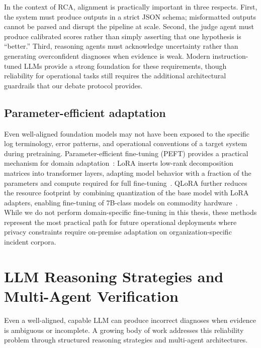 In the context of RCA, alignment is practically important in three respects. First, the system
must produce outputs in a strict JSON schema; misformatted outputs cannot be parsed and disrupt
the pipeline at scale. Second, the judge agent must produce calibrated scores rather than simply
asserting that one hypothesis is ``better.'' Third, reasoning agents must acknowledge uncertainty
rather than generating overconfident diagnoses when evidence is weak. Modern instruction-tuned
LLMs provide a strong foundation for these requirements, though reliability for operational tasks
still requires the additional architectural guardrails that our debate protocol provides.

\subsection{Parameter-efficient adaptation}

Even well-aligned foundation models may not have been exposed to the specific log terminology,
error patterns, and operational conventions of a target system during pretraining. Parameter-efficient
fine-tuning (PEFT) provides a practical mechanism for domain
adaptation~\cite{raffel2023exploringlimitstransferlearning}: LoRA inserts low-rank decomposition
matrices into transformer layers, adapting model behavior with a fraction of the parameters and
compute required for full fine-tuning~\cite{hu2021loralowrankadaptationlarge}. QLoRA further
reduces the resource footprint by combining quantization of the base model with LoRA adapters,
enabling fine-tuning of 7B-class models on commodity
hardware~\cite{dettmers2023qloraefficientfinetuningquantized}. While we do not perform
domain-specific fine-tuning in this thesis, these methods represent the most practical path for
future operational deployments where privacy constraints require on-premise adaptation on
organization-specific incident corpora.

\section{LLM Reasoning Strategies and Multi-Agent Verification}

Even a well-aligned, capable LLM can produce incorrect diagnoses when evidence is ambiguous or
incomplete. A growing body of work addresses this reliability problem through structured reasoning
strategies and multi-agent architectures.

